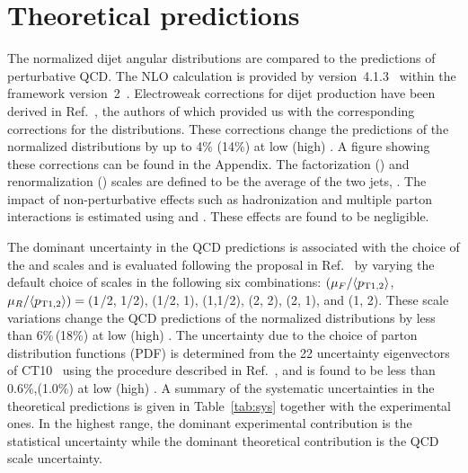 \documentclass[11pt,twoside,a4paper,cmspaper,final,collab]{cms-tdr}
\begin{document}
\section{Theoretical predictions}

The normalized dijet angular distributions are compared to
the predictions of perturbative QCD\@. The NLO calculation is provided by
\NLOJETPP version~4.1.3~\cite{Nagy:2001fj,Nagy:2003tz} within the
\fastNLO framework version~2~\cite{Kluge:2006xs,Britzger:2012bs}.
Electroweak corrections for dijet production have been derived in
Ref.~\cite{Dittmaier:2012kx}, the authors of which provided us with the
corresponding corrections for the \chijj distributions.
These corrections change the predictions
of the normalized \chijj distributions by up to 4\% (14\%) at low
(high) \mjj.
A figure showing these corrections can be found in the Appendix.
The factorization (\muf) and renormalization (\mur) scales
are defined to be the average \pt of the two jets, \avept.
The impact of non-perturbative effects such as hadronization and multiple
parton interactions is estimated using \PYTHIAE and \HERWIGpp. These
effects are found to be negligible.

The dominant uncertainty in the QCD predictions is associated with the
choice of the \mur and \muf scales and is evaluated following the
proposal in Ref.~\cite{Banfi:2010xy} by varying the default choice of
scales in the following six combinations: $(\mu_F/\langle p_\mathrm{T1,2}\rangle$,
$\mu_R/\langle p_\mathrm{T1,2}\rangle) = (1$/2, 1/2), (1/2, 1), (1,1/2), (2, 2), (2,
1), and (1, 2). These scale variations change the QCD predictions
of the normalized \chijj distributions by less than 6\%\,(18\%) at low
(high) \mjj. The uncertainty due to the choice of parton distribution functions (PDF) is determined
from the 22 uncertainty eigenvectors of CT10~\cite{Lai:2010vv} using the procedure
described in Ref.~\cite{Lai:2010vv}, and is found to be less than
0.6\%,(1.0\%) at low (high) \mjj. A summary of the systematic
uncertainties in the theoretical predictions is given in
Table~\ref{tab:sys} together with the experimental ones. In the
highest \mjj range, the dominant experimental contribution
is the statistical uncertainty while the dominant theoretical
contribution is the QCD scale uncertainty.
\end{document}
